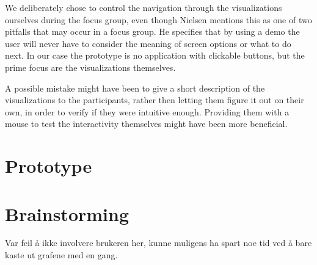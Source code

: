 We deliberately chose to control the navigation through the visualizations ourselves during the focus group, even though Nielsen mentions this as one of two pitfalls that may occur in a focus group. He specifies that by using a demo the user will never have to consider the meaning of screen options or what to do next. In our case the prototype is no application with clickable buttons, but the prime focus are the visualizations themselves. 

A possible mistake might have been to give a short description of the visualizations to the participants, rather then letting them figure it out on their own, in order to verify if they were intuitive enough. Providing them with a mouse to test the interactivity themselves might have been more beneficial.

\section{Prototype}

\section{Brainstorming}
Var feil å ikke involvere brukeren her, kunne muligens ha spart noe tid ved å bare kaste ut grafene med en gang.